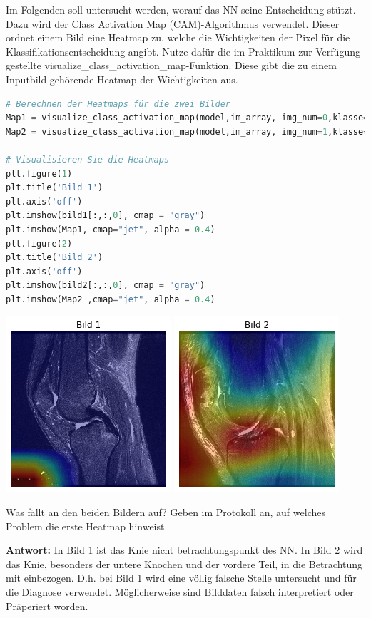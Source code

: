 \documentclass[a4paper,10pt,titlepage]{scrartcl}
\begin{document}
Im Folgenden soll untersucht werden, worauf das NN seine Entscheidung stützt. Dazu wird der Class Activation Map (CAM)-Algorithmus verwendet. Dieser ordnet einem Bild eine Heatmap zu, welche die Wichtigkeiten der Pixel für die Klassifikationsentscheidung angibt.
Nutze dafür die im Praktikum zur Verfügung gestellte visualize\_class\_activation\_map-Funktion. Diese gibt die zu einem Inputbild gehörende Heatmap der Wichtigkeiten aus.

\begin{lstlisting}[language=python]
# Berechnen der Heatmaps für die zwei Bilder
Map1 = visualize_class_activation_map(model,im_array, img_num=0,klasse=1)
Map2 = visualize_class_activation_map(model,im_array, img_num=1,klasse=0)

# Visualisieren Sie die Heatmaps
plt.figure(1)
plt.title('Bild 1')
plt.axis('off')
plt.imshow(bild1[:,:,0], cmap = "gray")
plt.imshow(Map1, cmap="jet", alpha = 0.4)
plt.figure(2)  
plt.title('Bild 2')
plt.axis('off')
plt.imshow(bild2[:,:,0], cmap = "gray")
plt.imshow(Map2 ,cmap="jet", alpha = 0.4)
\end{lstlisting}
\begin{center}
    \includegraphics[width=.2\linewidth]{Assets/prakBMT-DeepLearning-08.png}
    \includegraphics[width=.2\linewidth]{Assets/prakBMT-DeepLearning-09.png}
\end{center}

Was fällt an den beiden Bildern auf? Geben im Protokoll an, auf welches Problem die erste Heatmap hinweist.

\textbf{Antwort:} In Bild 1 ist das Knie nicht betrachtungspunkt des NN. In Bild 2 wird das Knie, besonders der untere Knochen und der vordere Teil, in die Betrachtung mit einbezogen. D.h. bei Bild 1 wird eine völlig falsche Stelle untersucht und für die Diagnose verwendet. Möglicherweise sind Bilddaten falsch interpretiert oder Präperiert worden.
\end{document}
